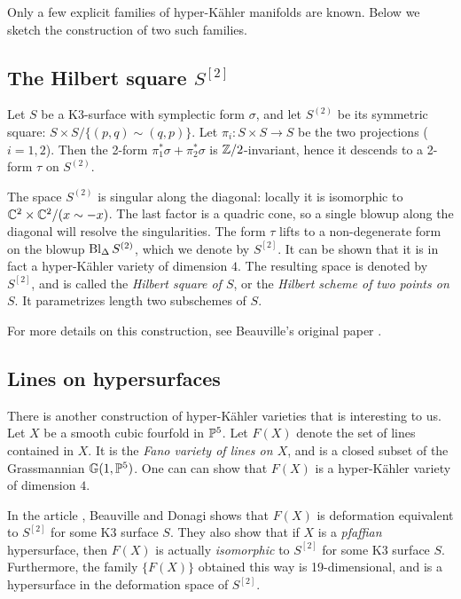 Only a few explicit families of hyper-Kähler manifolds are known. Below we sketch the construction of two such families.

\subsection{The Hilbert square $S^{[2]}$}

Let $S$ be a K3-surface with symplectic form $\sigma$, and let $S^{(2)}$ be its symmetric square: $S \times S / \{ (p,q) \sim (q,p) \}$. Let $\pi_i:S \times S \to S$ be the two projections ($i=1,2$). Then the 2-form $\pi_1^\ast \sigma + \pi_2^\ast \sigma$ is $\Z/2$-invariant, hence it descends to a 2-form  $\tau$ on $S^{(2)}$.

The space $S^{(2)}$ is singular along the diagonal: locally it is isomorphic to $\C^2 \times \C^2 /(x \sim -x)$. The last factor is a quadric cone, so a single blowup along the diagonal will resolve the singularities. The form $\tau$ lifts to a non-degenerate form on the blowup $\Bl_\Delta S^{(2)}$, which we denote by $S^{[2]}$. It can be shown that it is in fact a hyper-Kähler variety of dimension $4$. The resulting space is denoted by $S^{[2]}$, and is called the \emph{Hilbert square of $S$}, or the \emph{Hilbert scheme of two points on $S$}. It parametrizes length two subschemes of $S$.

For more details on this construction, see Beauville's original paper \cite{beauville_hyperkahler}.

\subsection{Lines on hypersurfaces}

There is another construction of hyper-Kähler varieties that is interesting to us. Let $X$ be a smooth cubic fourfold in $\P^5$. Let $F(X)$ denote the set of lines contained in $X$. It is the \emph{Fano variety of lines on $X$}, and is a closed subset of the Grassmannian $\mathbb G(1,\P^5)$. One can can show that $F(X)$ is a hyper-Kähler variety of dimension $4$.

In the article \cite{beauville_donagi_fano}, Beauville and Donagi shows that $F(X)$ is deformation equivalent to $S^{[2]}$ for some K3 surface $S$. They also show that if $X$ is a \emph{pfaffian} hypersurface, then $F(X)$ is actually \emph{isomorphic} to $S^{[2]}$ for some K3 surface $S$. Furthermore, the family $\{ F(X) \}$  obtained this way is 19-dimensional, and is a hypersurface in the deformation space of $S^{[2]}$.

